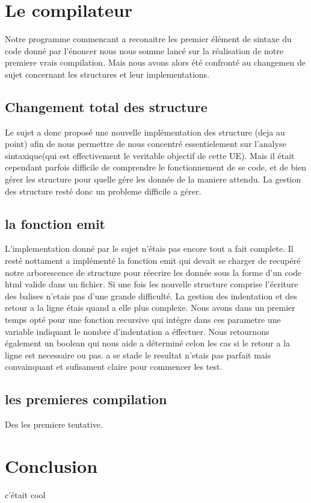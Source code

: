 \documentclass[12pt]{article}
\begin{document}
\newpage

\section{Le compilateur}

Notre programme commencant a reconaitre les premier élément de sintaxe
du code donné par l'énoncer nous nous somme lancé sur la réalisation de notre
premiere vrais compilation.
\newline
\newline
Mais nous avons alors été confronté au changemen de sujet concernant les structures
et leur implementations.

\subsection{Changement total des structure}

Le sujet a donc proposé une nouvelle implémentation des structure (deja au point) afin de nous
permettre de nous concentré essentielement sur l'analyse sintaxique(qui est effectivement
le veritable objectif de cette UE). Mais il était cependant parfois difficile de comprendre
le fonctionnement de se code, et de bien gérer les structure pour quelle gére les donnée
de la maniere attendu. La gestion des structure resté donc un probleme difficile
a gérer.

\subsection{la fonction emit}

L'implementation donné par le sujet n'étais pas encore tout a fait complete.
Il resté nottament a implémenté la fonction emit qui devait se charger de recupéré
notre arborescence de structure pour réecrire les donnée sous la forme d'un code
html valide dans un fichier.
\newline
\newline
Si une fois les nouvelle structure comprise l'écriture des balises n'etais pas
d'une grande difficulté. La gestion des indentation et des retour a la ligne
étais quand a elle plus complexe. Nous avons dans un premier temps opté pour
une fonction recursive qui intégre dans ces parametre une variable indiquant
le nombre d'indentation a éffectuer. Nous retournons également un boolean qui
nous aide a déterminé celon les cas si le retour a la ligne est necessaire ou pas.
\newline
a se stade le resultat n'etais pas parfait mais convainquant et sufisament claire
pour commencer les test.


\subsection{les premieres compilation}

Des les premiere tentative.

\newpage

\section{Conclusion}
c'était cool
\end{document}
